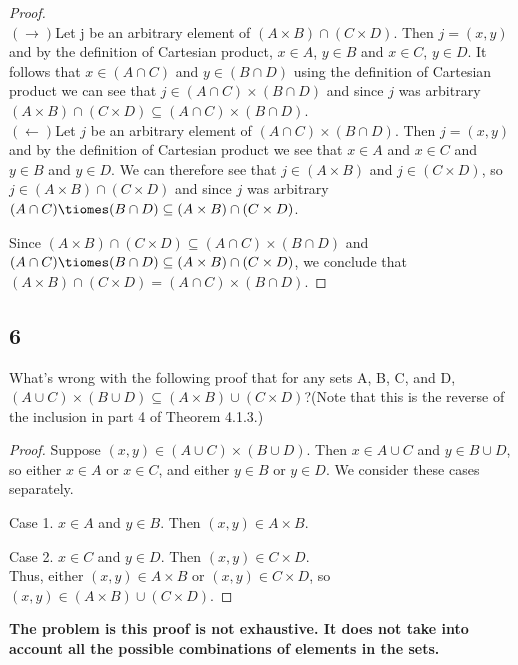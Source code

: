 \documentclass{article}
\begin{document}
\begin{proof}$ $\\
$(\rightarrow)$Let j be an arbitrary element of $(A \times B) \cap (C \times D)$. Then $j=(x,y)$ and by the definition of Cartesian product, $x \in A$, $y \in B$ and $x \in C$, $y \in D$. It follows that $x \in (A \cap C)$ and $y \in (B \cap D)$ using the definition of Cartesian product we can see that $j \in (A \cap C) \times (B \cap D)$ and since $j$ was arbitrary $(A \times B) \cap (C \times D) \subseteq (A \cap C) \times (B \cap D)$. \\
$(\leftarrow)$Let $j$ be an arbitrary element of $(A \cap C) \times (B \cap D)$. Then $j= (x,y)$ and by the definition of Cartesian product we see that $x \in A$ and $x \in C$ and $y \in B$ and $y \in D$. We can therefore see that $j \in (A \times B)$ and $j \in (C \times D)$, so $j \in (A \times B)\cap (C \times D)$ and since $j$ was arbitrary $(A \cap C)\tiomes (B \cap D) \subseteq (A \times B) \cap (C \times D)$.

Since $(A \times B) \cap (C \times D) \subseteq (A \cap C) \times (B \cap D)$ and $(A \cap C)\tiomes (B \cap D) \subseteq (A \times B) \cap (C \times D)$, we conclude that $(A \times B) \cap (C \times D)=(A \cap C)\times (B \cap D)$.

\end{proof}
\subsection{6}
What's wrong with the following proof that for any sets A, B, C, and D, $(A \cup C) \times (B \cup D) \subseteq(A \times B)\cup (C \times D)$?(Note that this is the reverse of the inclusion in part 4 of Theorem 4.1.3.)\\

\begin{proof}
Suppose $(x,y)\in (A \cup C) \times (B \cup D)$. Then $x \in A \cup C$ and $y \in B \cup D$, so either $x \in A$ or $x \in C$, and either $y \in B$ or $y \in D$. We consider these cases separately.

Case 1. $x \in A$ and $y \in B$. Then $(x,y) \in A \times B$.


Case 2. $x \in C$ and $y \in D$. Then $(x,y) \in C \times D$.\\
Thus, either $(x,y)\in A \times B$ or $(x,y)\in C \times D$, so $(x,y)\in (A \times B)\cup (C \times D)$.
\end{proof}

\textbf{The problem is this proof is not exhaustive. It does not take into account all the possible combinations of elements in the sets.}
\end{document}
